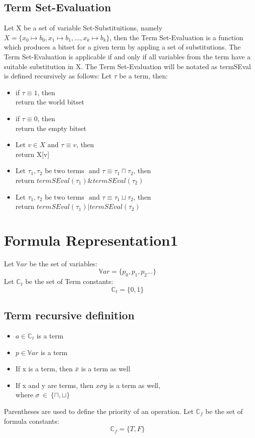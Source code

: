 \documentclass{article}
\begin{document}
		\subsection*{Term Set-Evaluation}
			Let X be a set of variable Set-Substituitions, namely $ X = \{ x_0 \longmapsto b_0, x_1 \longmapsto b_1, ..., x_k \longmapsto b_k \}$,
			then the Term Set-Evaluation is a function which produces a bitset for a given term by appling a set of substitutions.
			The Term Set-Evaluation is applicable if and only if all variables from the term have a suitable substitution in X.
			\newline
			\newline
			The Term Set-Evaluation will be notated as termSEval is defined recursively as follows:
			\newline
			Let $\tau$ be a term, then:
			\begin{itemize}
				\item if $\tau \equiv 1$, then \\
					return the world bitset
				\item if $\tau \equiv 0$, then \\
					return the empty bitset
				\item $\text{Let } v \in X \text{ and } \tau \equiv v$, then \\
					return X[v]
				\item $\text{Let } \tau_1, \tau_2 \text{ be two terms } \text{ and } \tau \equiv \tau_1 \sqcap \tau_2$, then \\
					return $termSEval(\tau_1) \& termSEval(\tau_2)$
				\item $\text{Let } \tau_1, \tau_2 \text{ be two terms } \text{ and } \tau \equiv \tau_1 \sqcup \tau_2$, then \\
					return $termSEval(\tau_1) | termSEval(\tau_2)$
			\end{itemize}
				
			

	\newpage
	\section{Formula Representation1}
	Let $\mathbb{V}ar$ be the set of variables:
	\[ \mathbb{V}ar = \{p_0, p_1, p_2 ... \}\]
	Let $\mathbb{C}_t$ be the set of Term constants:
	\[ \mathbb{C}_t = \{0, 1 \}\]
	\subsection{Term recursive definition}
	\begin{itemize}
		\item $a \in \mathbb{C}_t$ is a term
		\item $p \in \mathbb{V}ar$ is a term
		\item If x is a term, then $\bar{x}$ is a term as well
		\item If x and y are terms, then $x \sigma y $ is a term as well,\\
			where $\sigma \: \in \: \{\sqcap, \sqcup\}$
	\end{itemize}
	Parentheses are used to define the priority of an operation.
	\newline
	Let $\mathbb{C}_f$ be the set of formula constants:
	\[ \mathbb{C}_f = \{T, F \}\]
\end{document}
